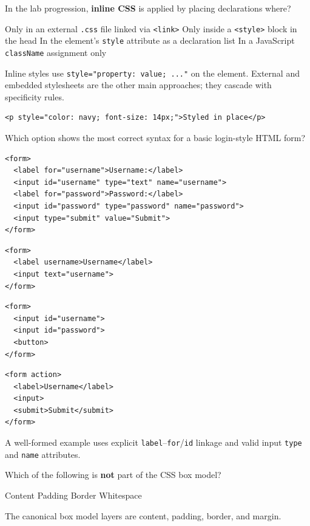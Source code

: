 \question[4]
In the lab progression, \textbf{inline CSS} is applied by placing declarations where?
\begin{choices}
  \choice Only in an external \texttt{.css} file linked via \texttt{<link>}
  \choice Only inside a \texttt{<style>} block in the head
  \CorrectChoice In the element's \texttt{style} attribute as a declaration list
  \choice In a JavaScript \texttt{className} assignment only
\end{choices}
\begin{solution}
  Inline styles use \texttt{style="property: value; ..."} on the element. External and embedded stylesheets are the other main approaches; they cascade with specificity rules.
\begin{lstlisting}[style=htmlexam]
<p style="color: navy; font-size: 14px;">Styled in place</p>
\end{lstlisting}
\end{solution}

\question[4]
Which option shows the most correct syntax for a basic login-style HTML form?
\begin{choices}
  \CorrectChoice
\begin{lstlisting}[style=htmlexam]
<form>
  <label for="username">Username:</label>
  <input id="username" type="text" name="username">
  <label for="password">Password:</label>
  <input id="password" type="password" name="password">
  <input type="submit" value="Submit">
</form>
\end{lstlisting}
  \choice
\begin{lstlisting}[style=htmlexam]
<form>
  <label username>Username</label>
  <input text="username">
</form>
\end{lstlisting}
  \choice
\begin{lstlisting}[style=htmlexam]
<form>
  <input id="username">
  <input id="password">
  <button>
</form>
\end{lstlisting}
  \choice
\begin{lstlisting}[style=htmlexam]
<form action>
  <label>Username</label>
  <input>
  <submit>Submit</submit>
</form>
\end{lstlisting}
\end{choices}
\begin{solution}
  A well-formed example uses explicit \texttt{label}--\texttt{for}/\texttt{id} linkage and valid input \texttt{type} and \texttt{name} attributes.
\end{solution}

\question[4]
Which of the following is \textbf{not} part of the CSS box model?
\begin{choices}
  \choice Content
  \choice Padding
  \choice Border
  \CorrectChoice Whitespace
\end{choices}
\begin{solution}
  The canonical box model layers are content, padding, border, and margin.
\end{solution}

